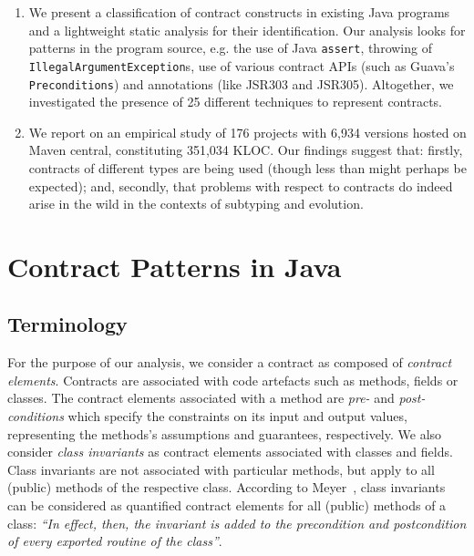 \documentclass[a4paper,UKenglish]{lipics-v2016}
\begin{document}
\begin{enumerate}
	
	\item We present a classification of contract constructs in existing Java programs and a lightweight static analysis for their identification.  Our analysis looks for patterns in the program source, e.g. the use of Java \texttt{assert}, throwing of \texttt{IllegalArgumentException}s, use of various contract APIs (such as Guava's \texttt{Preconditions}) and annotations (like JSR303 and JSR305). Altogether, we investigated the presence of 25 different techniques to represent contracts.
	
	\item We report on an empirical study of 176 projects with 6,934 versions hosted on Maven central, constituting 351,034 KLOC.  Our findings suggest that: firstly, contracts of different types are being used (though less than might perhaps be expected); and, secondly, that problems with respect to contracts do indeed arise in the wild in the contexts of subtyping and evolution. 
	
\end{enumerate} 




\section{Contract Patterns in Java}
\label{sec:constraints-kinds}


\subsection{Terminology}

For the purpose of our analysis, we consider a contract as composed of {\em contract elements}. Contracts are associated with code artefacts such as methods, fields or classes. The contract elements associated with a method are \textit{pre-} and \textit{post-conditions} which specify the constraints on its input and output values, representing the methods's assumptions and guarantees, respectively. We also consider \textit{class invariants} as contract elements associated with classes and fields. Class invariants are not associated with particular methods, but apply to all (public) methods of the respective class. According to Meyer~\cite{meyer1992applying}, class invariants can be considered as quantified contract elements for all (public) methods of a class: \textit{``In effect, then, the invariant is added to the precondition and postcondition of every exported routine of the class''}. 
\end{document}

